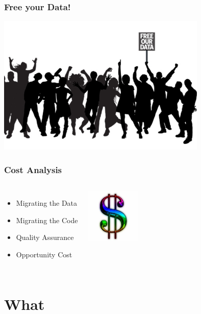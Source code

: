 \documentclass{beamer}
\begin{document}
\begin{frame}[fragile]
  \frametitle{Free your Data!}

\begin{center}
  \includegraphics[height=18em]{free-our-open-data.jpg}
\end{center}
\end{frame}

\begin{frame}[fragile]
  \frametitle{Cost Analysis}
  
  \vfill

\begin{columns}

  \begin{itemize}
  \item Migrating the Data
  \item Migrating the Code
  \item Quality Assurance
  \item Opportunity Cost
  \end{itemize}  

\begin{center}
  \includegraphics[height=7em]{Dollar-sign.jpg}
\end{center}
\end{columns}
\end{frame}

\section{What}
\end{document}
